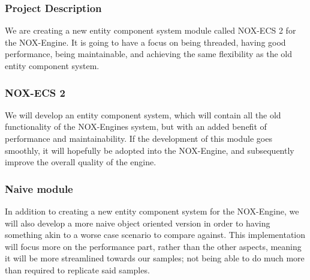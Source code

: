 \subsubsection{Project Description}
We are creating a new entity component system module called NOX-ECS 2 for the NOX-Engine. It is going to have a focus on being threaded, having good performance, being maintainable, and achieving the same flexibility as the old entity component system.

\subsubsection*{NOX-ECS 2}
We will develop an entity component system, which will contain all the old functionality of the NOX-Engines system, but with an added benefit of performance and maintainability. If the development of this module goes smoothly, it will hopefully be adopted into the NOX-Engine, and subsequently improve the overall quality of the engine.

\subsubsection*{Naive module}
In addition to creating a new entity component system for the NOX-Engine, we will also develop a more naive object oriented version in order to having something akin to a worse case scenario to compare against. This implementation will focus more on the performance part, rather than the other aspects, meaning it will be more streamlined towards our samples; not being able to do much more than required to replicate said samples.